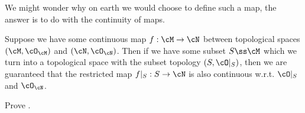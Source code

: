 We might wonder why on earth we would choose to define such a map, the answer is to do with the continuity of maps. 

\bcl 
\label{claim:RestrictedMapContinuous}
    Suppose we have some continuous map $f:\cM\to \cN$ between topological spaces $(\cM,\cO_{\cM})$ and $(\cN,\cO_{\cN})$. Then if we have some subset $S\ss \cM$ which we turn into a topological space with the subset topology $(S,\cO|_S)$, then we are guaranteed that the restricted map $f|_S : S\to \cN$ is also continuous w.r.t. $\cO|_S$ and $\cO_{\cN}$. 
\ecl 

\bbox 
    Prove .
\ebox 
